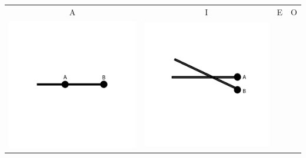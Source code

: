 \documentclass[12pt,a4paper]{report}
\begin{document}
\begin{table}[h!]
  \centering
  \begin{tabular}{  c  c  c  c }
    A & I & E & O\\
    \begin{minipage}{.22\textwidth}
      \includegraphics[width=\linewidth]{ALinear}
    \end{minipage}
    &
    \begin{minipage}{.22\textwidth}
      \includegraphics[width=\linewidth]{ILinear}

\end{minipage}
\end{tabular}
\end{table}
\end{document}
